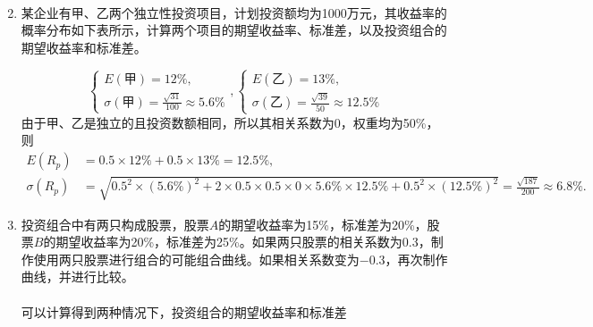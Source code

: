 \begin{enumerate}
\begin{align*}
    \end{align*}
    \item 某企业有甲、乙两个独立性投资项目，计划投资额均为1000万元，其收益率的概率分布如下表所示，计算两个项目的期望收益率、标准差，以及投资组合的期望收益率和标准差。
    \begin{center}
    \end{center}
    \sol
    \[\begin{cases}
        E(\text{甲}) = 12\%, \\ \displaystyle\sigma(\text{甲}) = \frac{\sqrt{31}}{100} \approx 5.6\%
    \end{cases},
    \begin{cases}
        E(\text{乙}) = 13\%, \\ \displaystyle\sigma(\text{乙}) = \frac{\sqrt{39}}{50} \approx 12.5\%
    \end{cases}\]
    由于甲、乙是独立的且投资数额相同，所以其相关系数为0，权重均为50\%，则
    \begin{align*}
        E(R_p) & = 0.5 \times 12\% + 0.5 \times 13\% = 12.5\%,\\
        \sigma(R_p) & = \sqrt{0.5^2 \times (5.6\%)^2 + 2 \times 0.5 \times 0.5 \times 0 \times 5.6\% \times 12.5\% + 0.5^2 \times (12.5\%)^2} = \frac{\sqrt{187}}{200} \approx 6.8 \%.
    \end{align*}
    \item 投资组合中有两只构成股票，股票$A$的期望收益率为15\%，标准差为20\%，股票$B$的期望收益率为20\%，标准差为25\%。如果两只股票的相关系数为0.3，制作使用两只股票进行组合的可能组合曲线。如果相关系数变为$-0.3$，再次制作曲线，并进行比较。\\
    \sol\\
    可以计算得到两种情况下，投资组合的期望收益率和标准差
    \begin{center}
\end{center}
\end{enumerate}
